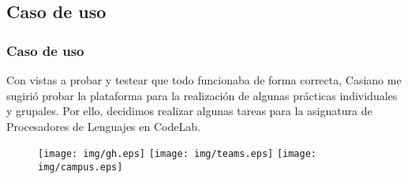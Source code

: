 \documentclass{beamer}
\begin{document}
\subsection{Caso de uso}

\begin{frame}[allowframebreaks]
\frametitle{Caso de uso}

  Con vistas a probar y testear que todo funcionaba de forma correcta, Casiano me sugirió probar 
  la plataforma para la realización de algunas prácticas individuales y grupales. Por ello, decidimos 
  realizar algunas tareas para la asignatura de Procesadores de Lenguajes en CodeLab.

  \framebreak

  \begin{figure}[!htb]
      \texttt{[image: img/gh.eps]}
    \endminipage\hfill
      \texttt{[image: img/teams.eps]}
    \endminipage\hfill
      \texttt{[image: img/campus.eps]}
    \endminipage
  \end{figure}

\end{frame}

\end{document}
